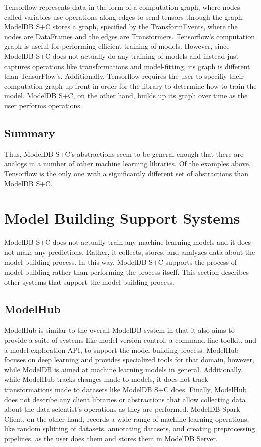 Tensorflow represents data in the form of a computation graph, where nodes 
called variables use operations along edges to send tensors through the graph.
ModelDB S+C stores a graph, specified by the TransformEvents, where the 
nodes are DataFrames and the edges are Transformers. Tensorflow's computation 
graph is useful for performing efficient training of models. However, since 
ModelDB S+C does not actually do any training of models and instead just 
captures operations like transformations and model-fitting, its graph is 
different than TensorFlow's. Additionally, Tensorflow requires the user to 
specifiy their computation graph up-front in order for
the library to determine how to train the model. ModelDB S+C, on 
the other hand, builds up its graph over time as the user performs operations.

\subsection{Summary}
Thus, ModelDB S+C's abstractions seem to be general enough that there are analogs
in a number of other machine learning libraries. Of the examples above, Tensorflow
is the only one with a significantly different set of abstractions than ModelDB S+C.

\section{Model Building Support Systems}
ModelDB S+C does not actually train any machine learning models and it does not 
make any predictions. Rather, it collects, stores, and analyzes data about 
the model building process. In this way, ModelDB S+C supports the process of
model building rather than performing the process itself. This section describes
other systems that support the model building process.

\subsection{ModelHub}
ModelHub \cite{modelhub} is similar to the overall ModelDB system in that it also
aims to provide a suite of systems like model version control, a command line
toolkit, and a model exploration API, to support the model building process. ModelHub
focuses on deep learning and provides specialized tools for that domain, however, 
while ModelDB is aimed at machine learning models in general. Additionally, while
ModelHub tracks changes made to models, it does not track transformations 
made to datasets like ModelDB S+C does. Finally, ModelHub does not describe
any client libraries or abstractions that allow collecting data about the data
scientist's operations as they are performed. ModelDB Spark Client, on the other hand,
records a wide range of machine learning operations, like random splitting of datasets,
annotating datasets, and creating preprocessing pipelines, as the user does them and
stores them in ModelDB Server.

